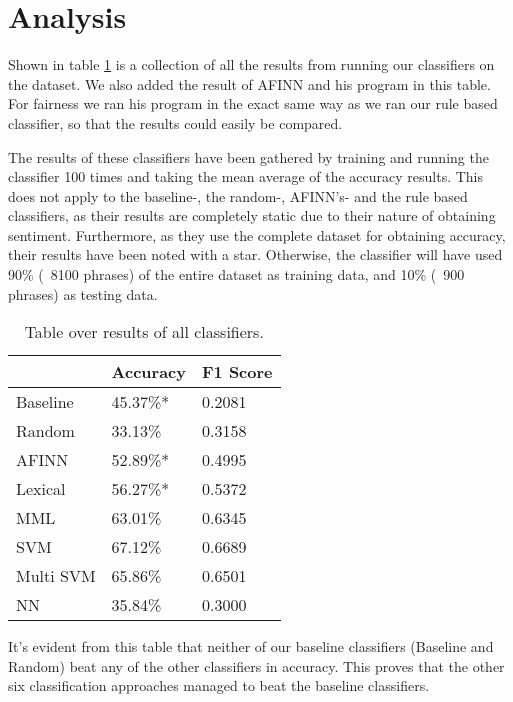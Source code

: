 \section{Analysis} \label{analysis}

Shown in table \ref{analysisstat} is a collection of all the results from running our classifiers on the dataset. We also added the result of AFINN and his program in this table. For fairness we ran his program in the exact same way as we ran our rule based classifier, so that the results could easily be compared.

The results of these classifiers have been gathered by training and running the classifier 100 times and taking the mean average of the accuracy results. This does not apply to the baseline-, the random-, AFINN's- and the rule based classifiers, as their results are completely static due to their nature of obtaining sentiment. Furthermore, as they use the complete dataset for obtaining accuracy, their results have been noted with a star. Otherwise, the classifier will have used 90\% (~8100 phrases) of the entire dataset as training data, and 10\% (~900 phrases) as testing data.
\begin{table}[H]
	\begin{tabular}{@{}lll@{}}
		\toprule
		& Accuracy & F1 Score \\ \midrule
		Baseline  & 45.37\%* & 0.2081   \\
		Random    & 33.13\%  & 0.3158   \\
		AFINN     & 52.89\%* & 0.4995   \\
		Lexical   & 56.27\%* & 0.5372   \\
		MML       & 63.01\%  & 0.6345   \\
		SVM       & 67.12\%  & 0.6689   \\
		Multi SVM & 65.86\%  & 0.6501   \\
		NN        & 35.84\%  & 0.3000   \\ \bottomrule
	\end{tabular}
	\caption{Table over results of all classifiers.}
	\label{analysisstat}
\end{table}
It's evident from this table that neither of our baseline classifiers (Baseline and Random) beat any of the other classifiers in accuracy. This proves that the other six classification approaches managed to beat the baseline classifiers.

